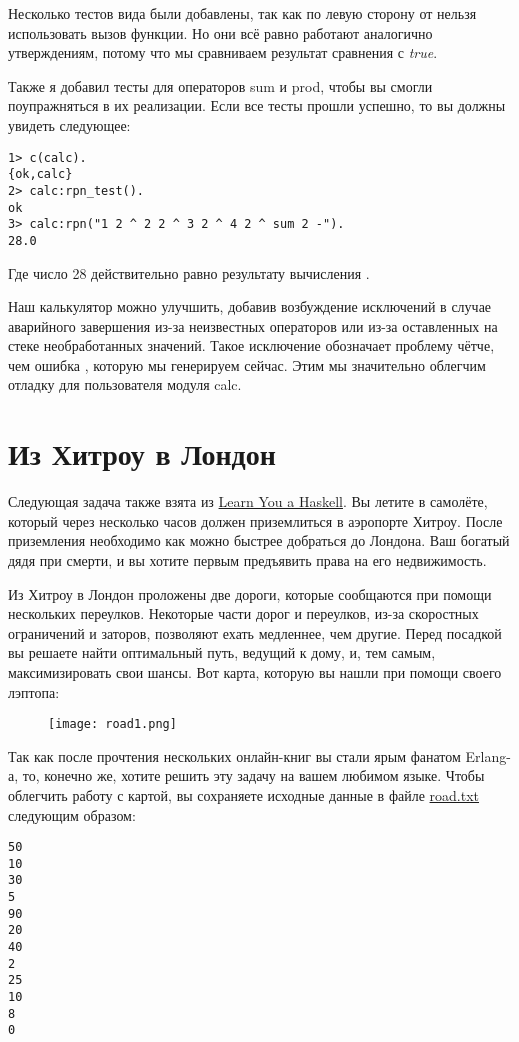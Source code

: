 Несколько тестов вида  были добавлены, так как по левую сторону от \ops{=\strut} нельзя использовать вызов функции.
Но они всё равно работают аналогично утверждениям, потому что мы сравниваем результат сравнения с \emph{true}.

Также я добавил тесты для операторов sum и prod, чтобы вы смогли поупражняться в их реализации.
Если все тесты прошли успешно, то вы должны увидеть следующее:
\begin{lstlisting}[style=erlang]
1> c(calc).
{ok,calc}
2> calc:rpn_test().
ok
3> calc:rpn("1 2 ^ 2 2 ^ 3 2 ^ 4 2 ^ sum 2 -").
28.0
\end{lstlisting}

Где число 28 действительно равно результату вычисления .

Наш калькулятор можно улучшить, добавив возбуждение исключений  в случае аварийного завершения из\--за неизвестных операторов или из\--за оставленных на стеке необработанных значений.
Такое исключение обозначает проблему чётче, чем ошибка , которую мы генерируем сейчас.
Этим мы значительно облегчим отладку для пользователя модуля calc.

\section{Из Хитроу в Лондон}
\label{heathrow-to-london}
Следующая задача также взята из \href{http://learnyouahaskell.com/functionally-solving-problems#heathrow-to-london}{Learn You a Haskell}.
Вы летите в самолёте, который через несколько часов должен приземлиться в аэропорте Хитроу.
После приземления необходимо как можно быстрее добраться до Лондона.
Ваш богатый дядя при смерти, и вы хотите первым предъявить права на его недвижимость.

Из Хитроу в Лондон проложены две дороги, которые сообщаются при помощи нескольких переулков.
Некоторые части дорог и переулков, из\--за скоростных ограничений и заторов, позволяют ехать медленнее, чем другие.
Перед посадкой вы решаете найти оптимальный путь, ведущий к дому, и, тем самым, максимизировать свои шансы.
Вот карта, которую вы нашли при помощи своего лэптопа:
\begin{figure}[h!]
    \centering
    \texttt{[image: road1.png]}
\end{figure}

Так как после прочтения нескольких онлайн\--книг вы стали ярым фанатом Erlang\--а, то, конечно же, хотите решить эту задачу на вашем любимом языке.
Чтобы облегчить работу с картой, вы сохраняете исходные данные в файле \href{http://learnyousomeerlang.com/static/erlang/road.txt}{road.txt} следующим образом:
\begin{lstlisting}[style=erlang]
50
10
30
5
90
20
40
2
25
10
8
0
\end{lstlisting}

